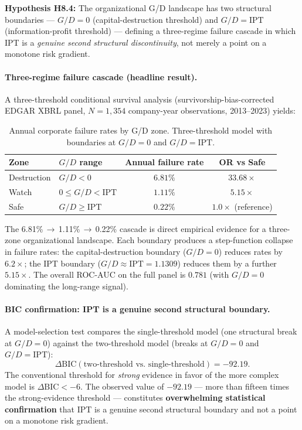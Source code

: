 \documentclass[11pt]{article}
\theoremstyle{remark}
\newcommand{\IPT}{\mathrm{IPT}}
\begin{document}
\textbf{Hypothesis H8.4:} The organizational G/D landscape has two structural
boundaries --- $G/D = 0$ (capital-destruction threshold) and $G/D = \IPT$
(information-profit threshold) --- defining a three-regime failure cascade in which
IPT is a \emph{genuine second structural discontinuity}, not merely a point on a
monotone risk gradient.

\paragraph{Three-regime failure cascade (headline result).}
A three-threshold conditional survival analysis (survivorship-bias-corrected
EDGAR XBRL panel, $N=1{,}354$ company-year observations, 2013--2023) yields:

\begin{table}[H]
\centering
\caption{Annual corporate failure rates by G/D zone. Three-threshold model
with boundaries at $G/D = 0$ and $G/D = \IPT$.}
\label{tab:org_survival}
\begin{tabular}{@{}llcc@{}}
\toprule
Zone & $G/D$ range & Annual failure rate & OR vs Safe \\
\midrule
Destruction & $G/D < 0$ & $6.81\%$ & $33.68\times$ \\
Watch & $0 \leq G/D < \IPT$ & $1.11\%$ & $5.15\times$ \\
Safe & $G/D \geq \IPT$ & $0.22\%$ & $1.0\times$ (reference) \\
\bottomrule
\end{tabular}
\end{table}

\noindent The 6.81\%\,$\to$\,1.11\%\,$\to$\,0.22\% cascade is direct empirical evidence
for a three-zone organizational landscape. Each boundary produces a step-function
collapse in failure rates: the capital-destruction boundary ($G/D = 0$) reduces
rates by $6.2\times$; the IPT boundary ($G/D \approx \IPT = 1.1309$) reduces them
by a further $5.15\times$. The overall ROC-AUC on the full panel is $0.781$ (with
$G/D = 0$ dominating the long-range signal).

\paragraph{BIC confirmation: IPT is a genuine second structural boundary.}
A model-selection test compares the single-threshold model (one structural break
at $G/D = 0$) against the two-threshold model (breaks at $G/D = 0$ and $G/D = \IPT$):
\[
  \Delta\mathrm{BIC}(\text{two-threshold vs.\ single-threshold}) = -92.19.
\]
The conventional threshold for \emph{strong} evidence in favor of the more complex
model is $\Delta\mathrm{BIC} < -6$.
The observed value of $-92.19$ --- more than fifteen times the strong-evidence
threshold --- constitutes \textbf{overwhelming statistical confirmation} that $\IPT$
is a genuine second structural boundary and not a point on a monotone risk gradient.
\end{document}
